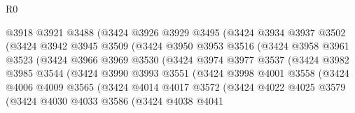 \begin{lexlean}{R0}
\begin{coremodule}
                      @3918
                      @3921
                      @3488
                      (@3424
                        @3926
                        @3929
                        @3495
                        (@3424
                          @3934
                          @3937
                          @3502
                          (@3424
                            @3942
                            @3945
                            @3509
                            (@3424
                              @3950
                              @3953
                              @3516
                              (@3424
                                @3958
                                @3961
                                @3523
                                (@3424
                                  @3966
                                  @3969
                                  @3530
                                  (@3424
                                    @3974
                                    @3977
                                    @3537
                                    (@3424
                                      @3982
                                      @3985
                                      @3544
                                      (@3424
                                        @3990
                                        @3993
                                        @3551
                                        (@3424
                                          @3998
                                          @4001
                                          @3558
                                          (@3424
                                            @4006
                                            @4009
                                            @3565
                                            (@3424
                                              @4014
                                              @4017
                                              @3572
                                              (@3424
                                                @4022
                                                @4025
                                                @3579
                                                (@3424
                                                  @4030
                                                  @4033
                                                  @3586
                                                  (@3424
                                                    @4038
                                                    @4041

\end{coremodule}
\end{lexlean}

